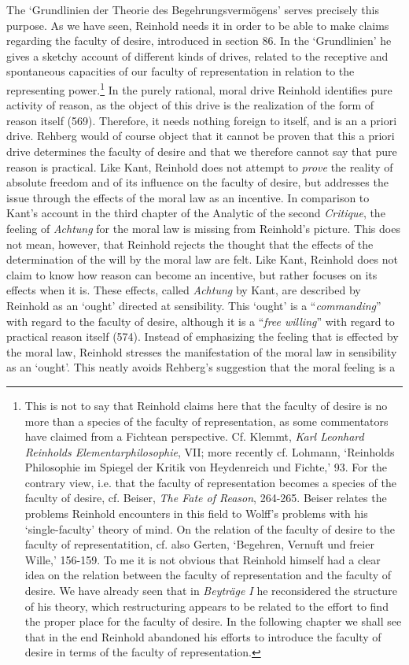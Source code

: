  The `Grundlinien der Theorie des Begehrungsverm\"{o}gens' serves precisely this purpose. As we have seen, Reinhold needs it in order to be able to make claims regarding the faculty of desire, introduced in section 86. In the `Grundlinien' he gives a sketchy account of different kinds of drives, related to the receptive and spontaneous capacities of our faculty of representation in relation to the representing power.\footnote{ This is not to say that Reinhold claims here that the faculty of desire is no more than a species of the faculty of representation, as some commentators have claimed from a Fichtean perspective. Cf. Klemmt, \textit{Karl Leonhard Reinholds Elementarphilosophie}, VII; more recently cf. Lohmann, `Reinholds Philosophie im Spiegel der Kritik von Heydenreich und Fichte,' 93. For the contrary view, i.e. that the faculty of representation becomes a species of the faculty of desire, cf. Beiser, \textit{The Fate of Reason}, 264{-}265. Beiser relates the problems Reinhold encounters in this field to Wolff's problems with his `single{-}faculty' theory of mind. On the relation of the faculty of desire to the faculty of representatition, cf. also Gerten, `Begehren, Vernuft und freier Wille,' 156{-}159. To me it is not obvious that Reinhold himself had a clear idea on the relation between the faculty of representation and the faculty of desire. We have already seen that in \textit{Beytr\"{a}ge I} he reconsidered the structure of his theory, which restructuring appears to be related to the effort to find the proper place for the faculty of desire. In the following chapter we shall see that in the end Reinhold abandoned his efforts to introduce the faculty of desire in terms of the faculty of representation. } In the purely rational, moral drive Reinhold identifies pure activity of reason, as the object of this drive is the realization of the form of reason itself (569). Therefore, it needs nothing foreign to itself, and is an a priori drive. Rehberg would of course object that it cannot be proven that this a priori drive determines the faculty of desire and that we therefore cannot say that pure reason is practical. Like Kant, Reinhold does not attempt to \textit{prove }the reality of absolute freedom and of its influence on the faculty of desire, but addresses the issue through the effects of the moral law as an incentive. In comparison to Kant's account in the third chapter of the Analytic of the second \textit{Critique}, the feeling of \textit{Achtung} for the moral law is missing from Reinhold's picture. This does not mean, however, that Reinhold rejects the thought that the effects of the determination of the will by the moral law are felt. Like Kant, Reinhold does not claim to know how reason can become an incentive, but rather focuses on its effects when it is. These effects, called \textit{Achtung }by Kant, are described by Reinhold as an `ought' directed at sensibility. This `ought' is a ``\textit{commanding}'' with regard to the faculty of desire, although it is a ``\textit{free willing}'' with regard to practical reason itself (574). Instead of emphasizing the feeling that is effected by the moral law, Reinhold stresses the manifestation of the moral law in sensibility as an `ought'. This neatly avoids Rehberg's suggestion that the moral feeling is a 